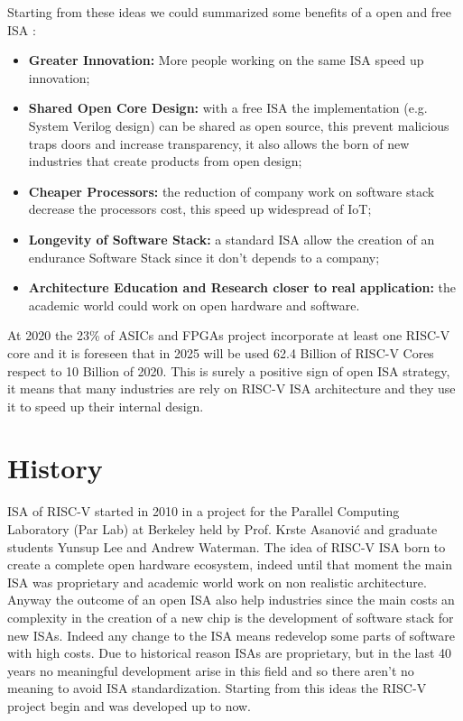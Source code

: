 {    Starting from these ideas we could summarized some benefits of a open and free ISA  :
    \begin{itemize}
        \item \textbf{Greater Innovation:} More people working on the same ISA speed up innovation;
        \item \textbf{Shared Open Core Design:} with a free ISA the implementation (e.g. System Verilog design) can be shared as open source, this prevent malicious traps doors and increase transparency, it also allows the born of new industries that create products from open design;
        \item \textbf{Cheaper Processors:} the reduction of company work on software stack decrease the processors cost, this speed up widespread of IoT;
        \item \textbf{Longevity of Software Stack:} a standard ISA allow the creation of an endurance Software Stack since it don't depends to a company;
        \item \textbf{Architecture Education and Research closer to real application: } the academic world could work on open hardware and software.
    \end{itemize}
    
    At 2020 the 23\% of ASICs and FPGAs project incorporate at least one RISC-V core and it is foreseen that in 2025 will be used 62.4 Billion of RISC-V Cores respect to 10 Billion of 2020.
    This is surely a positive sign of open ISA strategy, it means that many industries are rely on RISC-V ISA architecture and they use it to speed up their internal design.
    
	
	\section{History}{
	    ISA of RISC-V started in 2010 in a project for the Parallel Computing Laboratory (Par Lab) at Berkeley held by Prof. Krste Asanović and graduate students Yunsup Lee and Andrew Waterman.
	    The idea of RISC-V ISA born to create a complete open hardware ecosystem, indeed until that moment the main ISA was proprietary and academic world work on non realistic architecture.
	    Anyway the outcome of an open ISA also help industries since the main costs an complexity in the creation of a new chip is the development of software stack for new ISAs.
	    Indeed any change to the ISA means redevelop some parts of software with high costs.
	    Due to historical reason ISAs are proprietary, but in the last 40 years no meaningful development arise in this field and so there aren't no meaning to avoid ISA standardization. 
	    Starting from this ideas the RISC-V project begin and was developed up to now.\\
	    
}}
